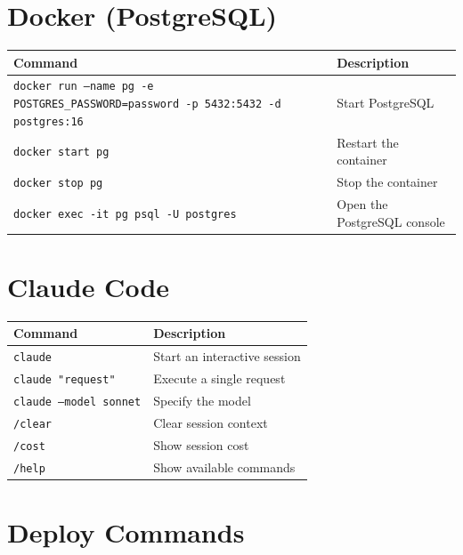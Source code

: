 \section{Docker (PostgreSQL)}

\begin{center}
\begin{small}
\begin{tabularx}{\textwidth}{l X}
\toprule
\textbf{Command} & \textbf{Description} \\
\midrule
\texttt{docker run --name pg -e POSTGRES\_PASSWORD=password -p 5432:5432 -d postgres:16} & Start PostgreSQL \\
\texttt{docker start pg} & Restart the container \\
\texttt{docker stop pg} & Stop the container \\
\texttt{docker exec -it pg psql -U postgres} & Open the PostgreSQL console \\
\bottomrule
\end{tabularx}
\end{small}
\end{center}

\section{Claude Code}

\begin{center}
\begin{tabularx}{\textwidth}{l X}
\toprule
\textbf{Command} & \textbf{Description} \\
\midrule
\texttt{claude} & Start an interactive session \\
\texttt{claude "request"} & Execute a single request \\
\texttt{claude --model sonnet} & Specify the model \\
\texttt{/clear} & Clear session context \\
\texttt{/cost} & Show session cost \\
\texttt{/help} & Show available commands \\
\bottomrule
\end{tabularx}
\end{center}

\section{Deploy Commands}


